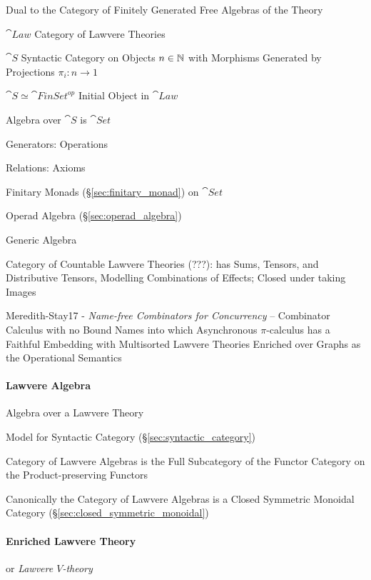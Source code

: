 Dual to the Category of Finitely Generated Free Algebras of the Theory

$\cat{Law}$ Category of Lawvere Theories

$\cat{S}$ Syntactic Category on Objects $n \in \mathbb{N}$ with Morphisms
Generated by Projections $\pi_i : n \rightarrow 1$

$\cat{S} \simeq \cat{FinSet}^{op}$ Initial Object in $\cat{Law}$

Algebra over $\cat{S}$ is $\cat{Set}$

Generators: Operations

Relations: Axioms

Finitary Monads (\S\ref{sec:finitary_monad}) on $\cat{Set}$

Operad Algebra (\S\ref{sec:operad_algebra})

Generic Algebra

Category of Countable Lawvere Theories (???): has Sums, Tensors, and
Distributive Tensors, Modelling Combinations of Effects; Closed under
taking Images \cite{hyland-power06}

Meredith-Stay17 - \emph{Name-free Combinators for Concurrency} --
Combinator Calculus with no Bound Names into which Asynchronous
$\pi$-calculus has a Faithful Embedding with Multisorted Lawvere
Theories Enriched over Graphs as the Operational Semantics



\paragraph{Lawvere Algebra}\label{sec:lawvere_algebra}\hfill

Algebra over a Lawvere Theory

Model for Syntactic Category (\S\ref{sec:syntactic_category})

Category of Lawvere Algebras is the Full Subcategory of the Functor
Category on the Product-preserving Functors %

Canonically the Category of Lawvere Algebras is a Closed Symmetric
Monoidal Category (\S\ref{sec:closed_symmetric_monoidal})



\paragraph{Enriched Lawvere Theory}\label{sec:enriched_lawvere}\hfill
\cite{hyland-power06}

or \emph{Lawvere $V$-theory}



